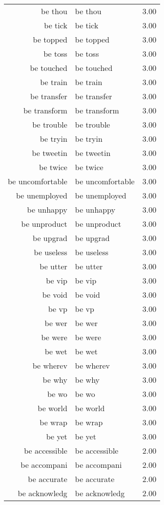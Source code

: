 \begin{table}[ht]
\begin{tabular}{rlr}
  be thou & be thou & 3.00 \\ 
  be tick & be tick & 3.00 \\ 
  be topped & be topped & 3.00 \\ 
  be toss & be toss & 3.00 \\ 
  be touched & be touched & 3.00 \\ 
  be train & be train & 3.00 \\ 
  be transfer & be transfer & 3.00 \\ 
  be transform & be transform & 3.00 \\ 
  be trouble & be trouble & 3.00 \\ 
  be tryin & be tryin & 3.00 \\ 
  be tweetin & be tweetin & 3.00 \\ 
  be twice & be twice & 3.00 \\ 
  be uncomfortable & be uncomfortable & 3.00 \\ 
  be unemployed & be unemployed & 3.00 \\ 
  be unhappy & be unhappy & 3.00 \\ 
  be unproduct & be unproduct & 3.00 \\ 
  be upgrad & be upgrad & 3.00 \\ 
  be useless & be useless & 3.00 \\ 
  be utter & be utter & 3.00 \\ 
  be vip & be vip & 3.00 \\ 
  be void & be void & 3.00 \\ 
  be vp & be vp & 3.00 \\ 
  be wer & be wer & 3.00 \\ 
  be were & be were & 3.00 \\ 
  be wet & be wet & 3.00 \\ 
  be wherev & be wherev & 3.00 \\ 
  be why & be why & 3.00 \\ 
  be wo & be wo & 3.00 \\ 
  be world & be world & 3.00 \\ 
  be wrap & be wrap & 3.00 \\ 
  be yet & be yet & 3.00 \\ 
  be accessible & be accessible & 2.00 \\ 
  be accompani & be accompani & 2.00 \\ 
  be accurate & be accurate & 2.00 \\ 
  be acknowledg & be acknowledg & 2.00 \\ 

\end{tabular}
\end{table}
